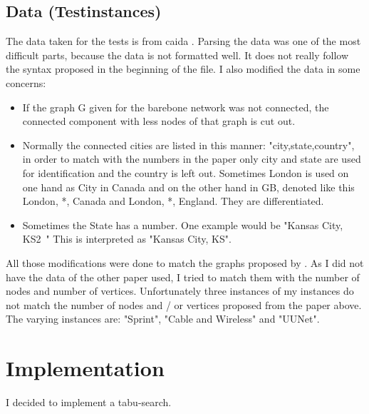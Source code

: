 \documentclass [12pt]{article}
\begin{document}
\subsection{Data (Testinstances)}
The data taken for the tests is from caida \cite{caidabarebones}. Parsing the
data was one of the most difficult parts, because the data is not formatted well.
It does not really follow the syntax proposed in the beginning of the file. I also
modified the data in some concerns:
\begin{itemize}
    \item If the graph G given for the barebone network was not connected,
        the connected component with less nodes of that graph is cut out.

    \item Normally the connected cities are listed in this manner:
        "city,state,country", in order to match with the numbers 
        in the paper \cite{mirrorserver} only city and state are used for
        identification and the country is left out. Sometimes London
        is used on one hand as City in Canada and on the other hand in GB, denoted like this
        London, *, Canada and London, *, England. They are differentiated.
    \item Sometimes the State has a number. One example would be "Kansas City, KS2~"
        This is interpreted as "Kansas City, KS".

\end{itemize}

All those modifications were done to match the graphs proposed by \cite{mirrorserver}.
As I did not have the data of the other paper used, I tried to match them with the number of
nodes and number of vertices. Unfortunately three instances of my instances do not
match the number of nodes and / or vertices proposed from the paper above.
The varying instances are: "Sprint", "Cable and Wireless" and "UUNet".

\section{Implementation}
I decided to implement a tabu-search.
\end{document}
